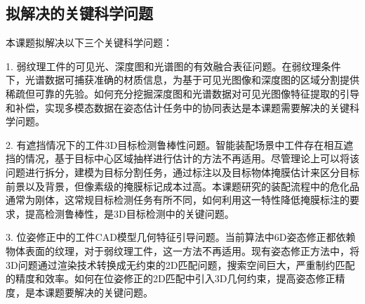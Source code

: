 \documentclass[12pt]{article}
\begin{document}



\subsection{拟解决的关键科学问题}

本课题拟解决以下三个关键科学问题：

1. 弱纹理工件的可见光、深度图和光谱图的有效融合表征问题。在弱纹理条件下，光谱数据可捕获准确的材质信息，为基于可见光图像和深度图的区域分割提供稀疏但可靠的先验。如何充分挖掘深度图和光谱数据对可见光图像特征提取的引导和补偿，实现多模态数据在姿态估计任务中的协同表达是本课题需要解决的关键科学问题。

2. 有遮挡情况下的工件3D目标检测鲁棒性问题。智能装配场景中工件存在相互遮挡的情况，基于目标中心区域抽样进行估计的方法不再适用。尽管理论上可以将该问题进行拆分，建模为目标分割任务，通过标注以及目标物体掩膜估计来区分目标前景以及背景，但像素级的掩膜标记成本过高。本课题研究的装配流程中的危化品通常为刚体，这常规目标检测任务有所不同，如何利用这一特性降低掩膜标注的要求，提高检测鲁棒性，是3D目标检测中的关键问题。
%

3. 位姿修正中的工件CAD模型几何特征引导问题。当前算法中6D姿态修正都依赖物体表面的纹理，对于弱纹理工件，这一方法不再适用。现有姿态修正方法中，将3D问题通过渲染技术转换成无约束的2D匹配问题，搜索空间巨大，严重制约匹配的精度和效率。如何在位姿修正的2D匹配中引入3D几何约束，提高姿态修正精度，是本课题要解决的关键问题。
\end{document}

